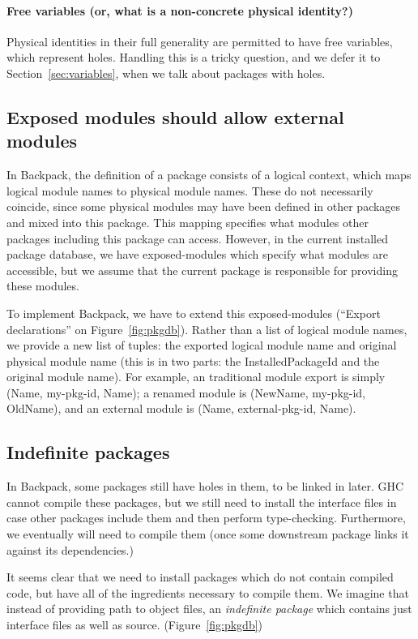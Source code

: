 \documentclass{article}
\begin{document}
\paragraph{Free variables (or, what is a non-concrete physical
identity?)} Physical identities in their full generality are permitted
to have free variables, which represent holes.  Handling this is a
tricky question, and we defer it to Section~\ref{sec:variables}, when
we talk about packages with holes.

\subsection{Exposed modules should allow external modules}\label{sec:reexport}

In Backpack, the definition of a package consists of a logical context,
which maps logical module names to physical module names.  These do not
necessarily coincide, since some physical modules may have been defined
in other packages and mixed into this package.  This mapping specifies
what modules other packages including this package can access.
However, in the current installed package database, we have exposed-modules which
specify what modules are accessible, but we assume that the current
package is responsible for providing these modules.

To implement Backpack, we have to extend this exposed-modules (``Export declarations''
on Figure~\ref{fig:pkgdb}).  Rather
than a list of logical module names, we provide a new list of tuples:
the exported logical module name and original physical module name (this
is in two parts: the InstalledPackageId and the original module name).
For example, an traditional module export is simply (Name, my-pkg-id, Name);
a renamed module is (NewName, my-pkg-id, OldName), and an external module
is (Name, external-pkg-id, Name).

\subsection{Indefinite packages}\label{sec:indefinite-packages}

In Backpack, some packages still have holes in them, to be linked in
later.  GHC cannot compile these packages, but we still need to install
the interface files in case other packages include them and then perform
type-checking.  Furthermore, we eventually will need to compile them
(once some downstream package links it against its dependencies.)

It seems clear that we need to install packages which do not contain
compiled code, but have all of the ingredients necessary to compile them.
We imagine that instead of providing path to object files, an \emph{indefinite
package} which contains just interface files as well as source. (Figure~\ref{fig:pkgdb})
\end{document}
